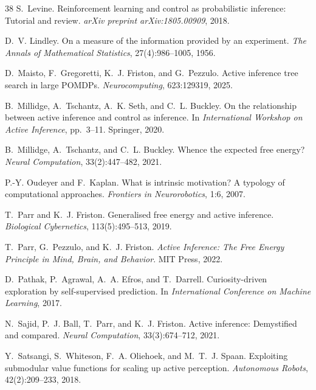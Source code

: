 \documentclass[runningheads]{llncs}
\begin{document}
\begin{thebibliography}{38}
S.~Levine.
\newblock Reinforcement learning and control as probabilistic inference: Tutorial and review.
\newblock \emph{arXiv preprint arXiv:1805.00909}, 2018.

D.~V. Lindley.
\newblock On a measure of the information provided by an experiment.
\newblock \emph{The Annals of Mathematical Statistics}, 27(4):986--1005, 1956.

D.~Maisto, F.~Gregoretti, K.~J. Friston, and G.~Pezzulo.
\newblock Active inference tree search in large {POMDP}s.
\newblock \emph{Neurocomputing}, 623:129319, 2025.

B.~Millidge, A.~Tschantz, A.~K. Seth, and C.~L. Buckley.
\newblock On the relationship between active inference and control as inference.
\newblock In \emph{International Workshop on Active Inference}, pp.\ 3--11. Springer, 2020.

B.~Millidge, A.~Tschantz, and C.~L. Buckley.
\newblock Whence the expected free energy?
\newblock \emph{Neural Computation}, 33(2):447--482, 2021.

P.-Y. Oudeyer and F.~Kaplan.
\newblock What is intrinsic motivation? {A} typology of computational approaches.
\newblock \emph{Frontiers in Neurorobotics}, 1:6, 2007.

T.~Parr and K.~J. Friston.
\newblock Generalised free energy and active inference.
\newblock \emph{Biological Cybernetics}, 113(5):495--513, 2019.

T.~Parr, G.~Pezzulo, and K.~J. Friston.
\newblock \emph{Active Inference: The Free Energy Principle in Mind, Brain, and Behavior}.
\newblock MIT Press, 2022.

D.~Pathak, P.~Agrawal, A.~A. Efros, and T.~Darrell.
\newblock Curiosity-driven exploration by self-supervised prediction.
\newblock In \emph{International Conference on Machine Learning}, 2017.

N.~Sajid, P.~J. Ball, T.~Parr, and K.~J. Friston.
\newblock Active inference: Demystified and compared.
\newblock \emph{Neural Computation}, 33(3):674--712, 2021.

Y.~Satsangi, S.~Whiteson, F.~A. Oliehoek, and M.~T.~J. Spaan.
\newblock Exploiting submodular value functions for scaling up active perception.
\newblock \emph{Autonomous Robots}, 42(2):209--233, 2018.


\end{thebibliography}
\end{document}
